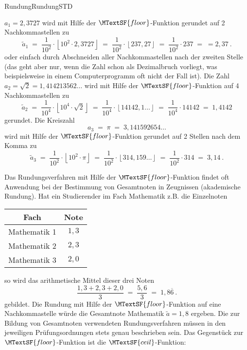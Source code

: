 \begin{MXContent}{Rundung}{Rundung}{STD}
\begin{MExample}
$a_1=2,3727$ wird mit Hilfe der $\MTextSF{floor}$-Funktion gerundet auf 2 Nachkommastellen zu
$$
\tilde a_1 \;=\; \frac1{10^2}\cdot \left\lfloor{10^2\cdot2,3727}\right\rfloor\; =\; \frac1{10^2}\cdot \left\lfloor{ 237,27}\right\rfloor \;=\; \frac1{10^2}\cdot 237\;=\; =2,37\: .
$$
oder einfach durch Abschneiden aller Nachkommastellen nach der zweiten Stelle (das geht aber nur, wenn die Zahl schon als Dezimalbruch vorliegt, was beispielsweise
in einem Computerprogramm oft nicht der Fall ist).
Die Zahl $a_2=\sqrt{2}=1,414213562\ldots$ wird mit Hilfe der $\MTextSF{floor}$-Funktion auf 4 Nachkommastellen zu
$$
\tilde a_2 \;=\; \frac1{10^4}\cdot \left\lfloor{ 10^4\cdot \sqrt2}\right\rfloor \;=\; \frac1{10^4}\cdot \left\lfloor{ 14142,1\ldots}\right\rfloor\;=\; \frac1{10^4}\cdot 14142 \;=\; 1,4142
$$
gerundet. Die Kreiszahl
$$
a_3 \;=\; \pi \;=\; 3,141592654\ldots
$$
wird mit Hilfe der $\MTextSF{floor}$-Funktion gerundet auf 2 Stellen nach dem Komma zu
$$
\tilde a_3 \;=\; \frac1{10^2}\cdot \left\lfloor{ 10^2\cdot\pi}\right\rfloor\;=\; \frac1{10^2}\cdot \left\lfloor{ 314,159\ldots}\right\rfloor \;=\; \frac1{10^2}\cdot 314 \;=\; 3,14\: .
$$
\end{MExample}

Das Rundungsverfahren mit Hilfe der $\MTextSF{floor}$-Funktion findet oft Anwendung bei der Bestimmung von Gesamtnoten in Zeugnissen (\glqq akademische Rundung\grqq).
Hat ein Studierender im Fach Mathematik z.B. die Einzelnoten

\begin{center}
\begin{tabular}{|c|c|}
\hline
Fach & Note \\ \hline
Mathematik 1 & $1,3$ \\ 
Mathematik 2 & $2,3$ \\ 
Mathematik 3 & $2,0$ \\ \hline
\end{tabular}
\end{center}

so wird das arithmetische Mittel dieser drei Noten
$$
\frac{1,3 + 2,3 + 2,0}{3}\; =\; \frac{5,6}{3} \; =\; 1,8\overline{6}\: .
$$
gebildet. Die Rundung mit Hilfe der $\MTextSF{floor}$-Funktion auf eine Nachkommastelle würde die Gesamtnote Mathematik $\tilde a=1,8$ ergeben.
Die zur Bildung von Gesamtnoten verwendeten Rundungsverfahren müssen in den jeweiligen Prüfungsordnungen stets genau beschrieben sein.
Das Gegenstück zur $\MTextSF{floor}$-Funktion ist die $\MTextSF{ceil}$-Funktion:


\end{MXContent}
